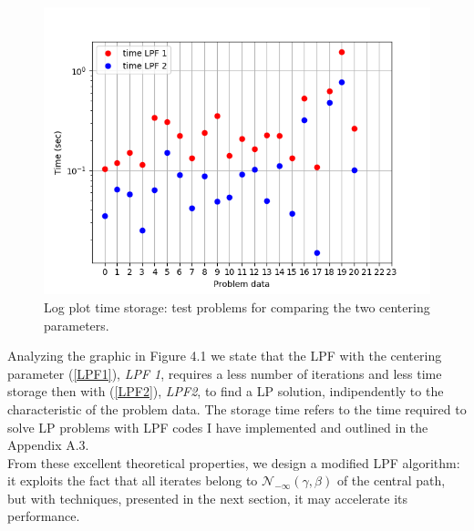 \documentclass[a4paper,10 pt,titlepage,twoside]{book}
\theoremstyle{plain}
\theoremstyle{definition}
\theoremstyle{remark}
\begin{document}
\begin{figure}\label{fig:float}
\begin{center}
\includegraphics[width=9 cm]{timeLPF12}\caption{Log plot time storage: test problems for comparing the two centering parameters.} 
\end{center}
\end{figure}
Analyzing the graphic in Figure 4.1 we state that the LPF with the centering parameter (\ref{LPF1}), \textit{LPF 1}, requires a less number of iterations and less time storage then  with (\ref{LPF2}), \textit{LPF2}, to find a LP solution, indipendently to the characteristic of the problem data. The storage time refers to the time required to solve LP problems with LPF codes I have implemented and outlined in the Appendix A.3.\\
From these excellent theoretical properties, we design a modified LPF algorithm: it exploits the fact that all iterates belong to $\mathcal{N}_{-\infty}(\gamma,\beta)$ of the central path, but with techniques, presented in the next section, it may accelerate its performance. 
\end{document}
